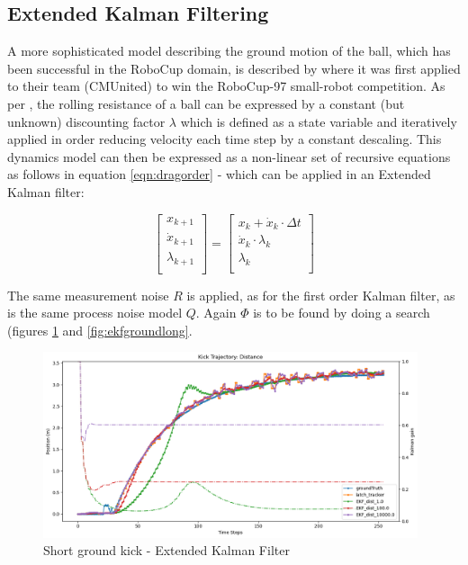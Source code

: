 \documentclass[a4paper,twoside,12pt]{report}
\begin{document}
\subsection{Extended Kalman Filtering}

A more sophisticated model describing the ground motion of the ball, which has been successful in the RoboCup domain, is described by \cite{kalmanmodel} where it was first applied to their team (CMUnited) to win the RoboCup-97 small-robot competition. As per \cite{kalmanmodel}, the rolling resistance of a ball can be expressed by a constant (but unknown) discounting factor $\lambda$ which is defined as a state variable and iteratively applied in order reducing velocity each time step by a constant descaling. This dynamics model can then be expressed as a non-linear set of recursive equations as follows in equation \ref{eqn:dragorder} - which can be applied in an Extended Kalman filter:

\begin{equation} 
\begin{bmatrix}
    x_{k+1} \\
    \dot{x}_{k+1} \\
	\lambda_{k+1} \\
\end{bmatrix}
=
\begin{bmatrix}
    x_{k} + \dot{x}_{k} \cdot \Delta t\\
    \dot{x}_{k} \cdot \lambda_{k} \\
	\lambda_{k} \\
\end{bmatrix}
\label{eqn:dragorder}
\end{equation}

The same measurement noise $R$ is applied, as for the first order Kalman filter, as is the same process noise model $Q$. Again $\Phi$ is to be found by doing a search (figures \ref{fig:ekfgroundshort} and \ref{fig:ekfgroundlong}.

\begin{figure}[h!]
\begin{center}
\includegraphics[width=11cm]{images/ekf_ground_short.png}
\caption{Short ground kick - Extended Kalman Filter}
\label{fig:ekfgroundshort}
\end{center}
\end{figure}
\end{document}
